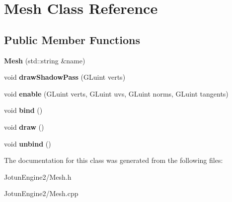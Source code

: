 \hypertarget{class_mesh}{\section{Mesh Class Reference}
\label{class_mesh}
}
\subsection*{Public Member Functions}
\begin{DoxyCompactItemize}
\item 
\hypertarget{class_mesh_a74ef69e992b8b973276731e447a66060}{{\bfseries Mesh} (std\-::string \&name)}\label{class_mesh_a74ef69e992b8b973276731e447a66060}

\item 
\hypertarget{class_mesh_ac8f218c96e9f31e9c8b9b69d284244a4}{void {\bfseries draw\-Shadow\-Pass} (G\-Luint verts)}\label{class_mesh_ac8f218c96e9f31e9c8b9b69d284244a4}

\item 
\hypertarget{class_mesh_a9bd32211408be9e187d97435c3dd183b}{void {\bfseries enable} (G\-Luint verts, G\-Luint uvs, G\-Luint norms, G\-Luint tangents)}\label{class_mesh_a9bd32211408be9e187d97435c3dd183b}

\item 
\hypertarget{class_mesh_a5237bc1186c7ecaa1af79738e3d7db50}{void {\bfseries bind} ()}\label{class_mesh_a5237bc1186c7ecaa1af79738e3d7db50}

\item 
\hypertarget{class_mesh_a996a8668fa2ca7d95d6d10744c833bc8}{void {\bfseries draw} ()}\label{class_mesh_a996a8668fa2ca7d95d6d10744c833bc8}

\item 
\hypertarget{class_mesh_a2b8d5a5df0d13a63c984339539a3f376}{void {\bfseries unbind} ()}\label{class_mesh_a2b8d5a5df0d13a63c984339539a3f376}

\end{DoxyCompactItemize}


The documentation for this class was generated from the following files\-:\begin{DoxyCompactItemize}
\item 
Jotun\-Engine2/Mesh.\-h\item 
Jotun\-Engine2/Mesh.\-cpp\end{DoxyCompactItemize}
